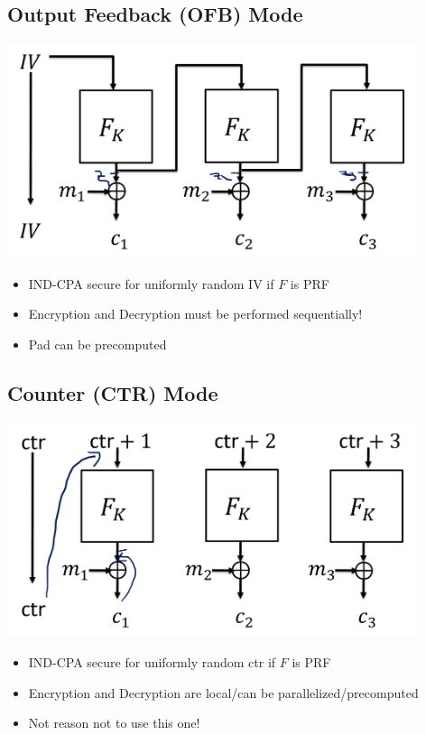	\subsection{Output Feedback (OFB) Mode}
		\begin{center}
			\includegraphics[width=120mm]{Graphics/Block Ciphers/bc11.png}
		\end{center}
		\begin{itemize}
			\item IND-CPA secure for uniformly random IV if $F$ is PRF
			\item Encryption and Decryption must be performed sequentially!
			\item Pad can be precomputed
		\end{itemize}
	
	\subsection{Counter (CTR) Mode}
		\begin{center}
			\includegraphics[width=120mm]{Graphics/Block Ciphers/bc12.png}
		\end{center}
		\begin{itemize}
			\item IND-CPA secure for uniformly random ctr if $F$ is PRF
			\item Encryption and Decryption are local/can be parallelized/precomputed
			\item Not reason not to use this one!
		\end{itemize}


